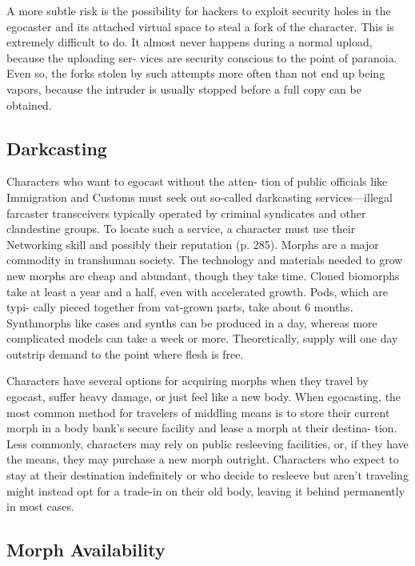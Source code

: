 A more subtle risk is the possibility for hackers to 
exploit security holes in the egocaster and its attached 
virtual space to steal a fork of the character. This is 
extremely difficult to do. It almost never happens 
during a normal upload, because the uploading ser-
vices are security conscious to the point of paranoia. 
Even so, the forks stolen by such attempts more often 
than not end up being vapors, because the intruder 
is usually stopped before a full copy can be obtained.

\subsection{Darkcasting}

Characters who want to egocast without the atten-
tion of public officials like Immigration and Customs 
must seek out so-called darkcasting services—illegal 
farcaster transceivers typically operated by criminal 
syndicates and other clandestine groups. To locate 
such a service, a character must use their Networking 
skill and possibly their reputation (p. 285).
Morphs are a major commodity in transhuman society. 
The technology and materials needed to grow new 
morphs are cheap and abundant, though they take 
time. Cloned biomorphs take at least a year and a half, 
even with accelerated growth. Pods, which are typi-
cally pieced together from vat-grown parts, take about 
6 months. Synthmorphs like cases and synths can be 
produced in a day, whereas more complicated models 
can take a week or more. Theoretically, supply will one 
day outstrip demand to the point where flesh is free.

Characters have several options for acquiring 
morphs when they travel by egocast, suffer heavy 
damage, or just feel like a new body. When egocasting, 
the most common method for travelers of middling 
means is to store their current morph in a body bank's 
secure facility and lease a morph at their destina-
tion. Less commonly, characters may rely on public 
resleeving facilities, or, if they have the means, they 
may purchase a new morph outright. Characters who 
expect to stay at their destination indefinitely or who 
decide to resleeve but aren't traveling might instead 
opt for a trade-in on their old body, leaving it behind 
permanently in most cases.

\subsection{Morph Availability}

